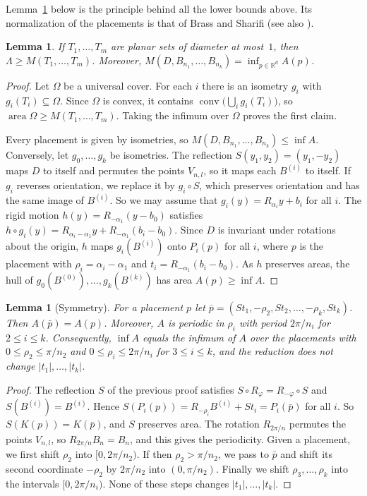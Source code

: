 \documentclass[11pt]{amsart}
\newtheorem{lemma}[theorem]{Lemma}
\theoremstyle{definition}
\theoremstyle{remark}
\numberwithin{equation}{section}
\newcommand{\R}{\mathbb{R}}
\newcommand{\area}{\operatorname{area}}
\newcommand{\conv}{\operatorname{conv}}
\begin{document}
Lemma~\ref{lem:testsets} below is the principle behind all the lower bounds above. Its normalization of the placements is that of Brass and Sharifi \cite{BS05} (see also \cite[Lemma~4.3]{Mis26}).

\begin{lemma}\label{lem:testsets}
If $T_1,\dots,T_m$ are planar sets of diameter at most~$1$, then $\Lambda\ge M(T_1,\dots,T_m)$. Moreover, $M(D,B_{n_1},\dots,B_{n_k})=\inf_{p\in\R^d}A(p)$.
\end{lemma}

\begin{proof}
Let $\Omega$ be a universal cover. For each $i$ there is an isometry $g_i$ with $g_i(T_i)\subseteq\Omega$. Since $\Omega$ is convex, it contains $\conv\bigl(\bigcup_ig_i(T_i)\bigr)$, so $\area\Omega\ge M(T_1,\dots,T_m)$. Taking the infimum over $\Omega$ proves the first claim.

Every placement is given by isometries, so $M(D,B_{n_1},\dots,B_{n_k})\le\inf A$. Conversely, let $g_0,\dots,g_k$ be isometries. The reflection $S(y_1,y_2)=(y_1,-y_2)$ maps $D$ to itself and permutes the points $V_{n,l}$, so it maps each $B^{(i)}$ to itself. If $g_i$ reverses orientation, we replace it by $g_i\circ S$, which preserves orientation and has the same image of $B^{(i)}$. So we may assume that $g_i(y)=R_{\alpha_i}y+b_i$ for all $i$. The rigid motion $h(y)=R_{-\alpha_1}(y-b_0)$ satisfies $h\circ g_i(y)=R_{\alpha_i-\alpha_1}y+R_{-\alpha_1}(b_i-b_0)$. Since $D$ is invariant under rotations about the origin, $h$ maps $g_i(B^{(i)})$ onto $P_i(p)$ for all $i$, where $p$ is the placement with $\rho_i=\alpha_i-\alpha_1$ and $t_i=R_{-\alpha_1}(b_i-b_0)$. As $h$ preserves areas, the hull of $g_0(B^{(0)}),\dots,g_k(B^{(k)})$ has area $A(p)\ge\inf A$.
\end{proof}

\begin{lemma}[Symmetry]\label{lem:symmetry}
For a placement $p$ let $\bar p=(St_1,-\rho_2,St_2,\dots,-\rho_k,St_k)$. Then $A(\bar p)=A(p)$. Moreover, $A$ is periodic in $\rho_i$ with period $2\pi/n_i$ for $2\le i\le k$. Consequently, $\inf A$ equals the infimum of $A$ over the placements with $0\le\rho_2\le\pi/n_2$ and $0\le\rho_i\le2\pi/n_i$ for $3\le i\le k$, and the reduction does not change $|t_1|,\dots,|t_k|$.
\end{lemma}

\begin{proof}
The reflection $S$ of the previous proof satisfies $S\circ R_\varphi=R_{-\varphi}\circ S$ and $S(B^{(i)})=B^{(i)}$. Hence $S(P_i(p))=R_{-\rho_i}B^{(i)}+St_i=P_i(\bar p)$ for all $i$. So $S(K(p))=K(\bar p)$, and $S$ preserves area. The rotation $R_{2\pi/n}$ permutes the points $V_{n,l}$, so $R_{2\pi/n}B_n=B_n$, and this gives the periodicity. Given a placement, we first shift $\rho_2$ into $[0,2\pi/n_2)$. If then $\rho_2>\pi/n_2$, we pass to $\bar p$ and shift its second coordinate $-\rho_2$ by $2\pi/n_2$ into $(0,\pi/n_2)$. Finally we shift $\rho_3,\dots,\rho_k$ into the intervals $[0,2\pi/n_i)$. None of these steps changes $|t_1|,\dots,|t_k|$.
\end{proof}
\end{document}
